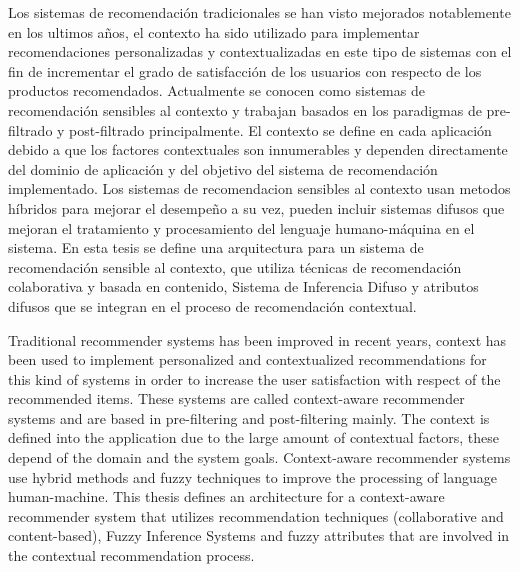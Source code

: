 


Los sistemas de recomendaci\'on tradicionales se han visto mejorados
notablemente en los ultimos a\~{n}os, el contexto ha sido utilizado para
implementar recomendaciones personalizadas y contextualizadas en este
tipo de sistemas con el fin de incrementar el grado de satisfacci\'on de
los usuarios con respecto de los productos recomendados. Actualmente
se conocen como sistemas de recomendaci\'on sensibles al contexto y
trabajan basados en los paradigmas de pre-filtrado y post-filtrado
principalmente. El contexto se define en cada aplicaci\'on debido a que
los factores contextuales son innumerables y dependen directamente del
dominio de aplicaci\'on y del objetivo del sistema de recomendaci\'on
implementado.  Los sistemas de recomendacion sensibles al contexto
usan metodos h\'ibridos para mejorar el desempe\~{n}o  a su vez, pueden
incluir sistemas difusos que mejoran el tratamiento y procesamiento
del lenguaje humano-m\'aquina en el sistema. En esta tesis se define una
arquitectura para un sistema de recomendaci\'on sensible al contexto,
que utiliza t\'ecnicas de recomendaci\'on colaborativa y basada en
contenido,  Sistema de Inferencia Difuso y atributos difusos que se
integran en el proceso de recomendaci\'on contextual.



Traditional recommender systems has been improved in recent years,
context has been used to implement personalized and contextualized
recommendations for this kind of systems in order to increase the user
satisfaction with respect of the recommended items. These systems are
called context-aware recommender systems and are based in pre-filtering and post-filtering mainly. The context is defined  into the
application due to the large amount of contextual factors, these
depend of the domain and the system goals. Context-aware recommender
systems use hybrid methods and fuzzy techniques to improve the
processing of language human-machine. This thesis defines  an
architecture  for a context-aware recommender system that utilizes
recommendation techniques (collaborative and content-based), Fuzzy
Inference Systems and fuzzy attributes that are involved in the
contextual recommendation process.










